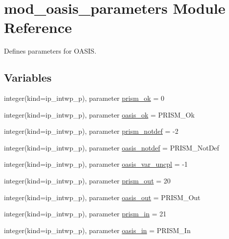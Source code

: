 \hypertarget{namespacemod__oasis__parameters}{}\section{mod\+\_\+oasis\+\_\+parameters Module Reference}
\label{namespacemod__oasis__parameters}


Defines parameters for O\+A\+S\+IS.  


\subsection*{Variables}
\begin{DoxyCompactItemize}
\item 
integer(kind=ip\+\_\+intwp\+\_\+p), parameter \hyperlink{namespacemod__oasis__parameters_aa7cbeb1a099f571702827ace878cdc64}{prism\+\_\+ok} = 0
\item 
integer(kind=ip\+\_\+intwp\+\_\+p), parameter \hyperlink{namespacemod__oasis__parameters_a3ea125963822918ce37fd3cfd9658c9f}{oasis\+\_\+ok} = P\+R\+I\+S\+M\+\_\+\+Ok
\item 
integer(kind=ip\+\_\+intwp\+\_\+p), parameter \hyperlink{namespacemod__oasis__parameters_aa388f517f0a947f770637d617bdda79b}{prism\+\_\+notdef} = -\/2
\item 
integer(kind=ip\+\_\+intwp\+\_\+p), parameter \hyperlink{namespacemod__oasis__parameters_acbe396fd3b5e7b00dd66425f0acb546d}{oasis\+\_\+notdef} = P\+R\+I\+S\+M\+\_\+\+Not\+Def
\item 
integer(kind=ip\+\_\+intwp\+\_\+p), parameter \hyperlink{namespacemod__oasis__parameters_ac906e1466e6cdc300a0b582af6619ca5}{oasis\+\_\+var\+\_\+uncpl} = -\/1
\item 
integer(kind=ip\+\_\+intwp\+\_\+p), parameter \hyperlink{namespacemod__oasis__parameters_a58d4e90d13e758e6a6dfab01e6a1415e}{prism\+\_\+out} = 20
\item 
integer(kind=ip\+\_\+intwp\+\_\+p), parameter \hyperlink{namespacemod__oasis__parameters_a76a150fa8ef6ed0b35183e627d757439}{oasis\+\_\+out} = P\+R\+I\+S\+M\+\_\+\+Out
\item 
integer(kind=ip\+\_\+intwp\+\_\+p), parameter \hyperlink{namespacemod__oasis__parameters_a9cd491b86da0ba4612f2de5a9ef52e7c}{prism\+\_\+in} = 21
\item 
integer(kind=ip\+\_\+intwp\+\_\+p), parameter \hyperlink{namespacemod__oasis__parameters_a16809ad581bb609aa5b0661927478653}{oasis\+\_\+in} = P\+R\+I\+S\+M\+\_\+\+In
\item 

\end{DoxyCompactItemize}
